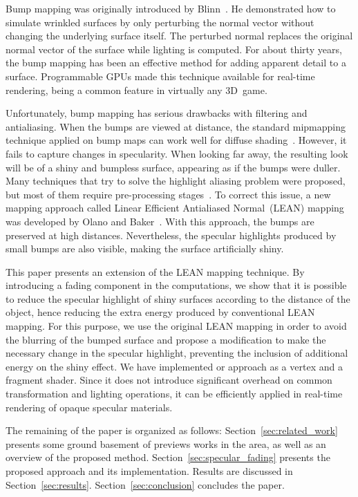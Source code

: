 \documentclass[10pt, conference]{IEEEtran}
\begin{document}
Bump mapping was originally introduced by Blinn~\cite{Blinn:1978:SWS:800248.507101}. He demonstrated how to simulate wrinkled surfaces by only perturbing the normal vector without changing the underlying surface itself. The perturbed normal replaces the original normal vector of the surface while lighting is computed. For about thirty years, the bump mapping has been an effective method for adding apparent detail to a surface. Programmable GPUs made this technique available for real-time rendering, being a common feature in virtually any 3D~game.

Unfortunately, bump mapping has serious drawbacks with filtering and antialiasing. When the bumps are viewed at distance, the standard mipmapping technique applied on bump maps can work well for diffuse shading~\cite{Kilgard00apractical}. However, it fails to capture changes in specularity. When looking far away, the resulting look will be of a shiny and bumpless surface, appearing as if the bumps were duller. Many techniques that try to solve the highlight aliasing problem were proposed, but most of them require pre-processing stages~\cite{Cabral:1987:BRF:37401.37434,Becker:1993:STB:166117.166141,Westin:1992:PRF:133994.134075}. To correct this issue, a new mapping approach called Linear Efficient Antialiased Normal~(LEAN) mapping was developed by Olano and Baker~\cite{Olano:2010:LM:1730804.1730834}. With this approach, the bumps are preserved at high distances. Nevertheless, the specular highlights produced by small bumps are also visible, making the surface artificially shiny.

This paper presents an extension of the LEAN mapping technique. By introducing a fading component in the computations, we show that it is possible to reduce the specular highlight of shiny surfaces according to the distance of the object, hence reducing the extra energy produced by conventional LEAN mapping. For this purpose, we use the original LEAN mapping in order to avoid the blurring of the bumped surface and propose a modification to make the necessary change in the specular highlight, preventing the inclusion of additional energy on the shiny effect. We have implemented or approach as a vertex and a fragment shader. Since it does not introduce significant overhead on common transformation and lighting operations, it can be efficiently applied in real-time rendering of opaque specular materials.

The remaining of the paper is organized as follows: Section~\ref{sec:related_work} presents some ground basement of previews works in the area, as well as an overview of the proposed method. Section~\ref{sec:specular_fading} presents the proposed approach and its implementation. Results are discussed in Section~\ref{sec:results}. Section~\ref{sec:conclusion} concludes the paper.
\end{document}
